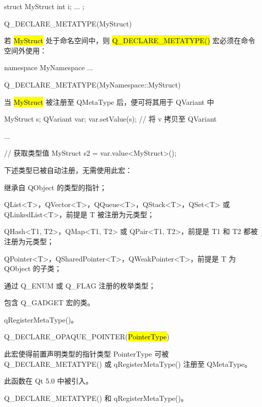 \begin{cppcode}
struct MyStruct
{
    int i;
    ...
};

Q_DECLARE_METATYPE(MyStruct)
\end{cppcode}

若 \hl{MyStruct} 处于命名空间中，则 \hl{Q\_DECLARE\_METATYPE()} 宏必须在命令空间外使用：

\begin{cppcode}
namespace MyNamespace
{
    ...
}

Q_DECLARE_METATYPE(MyNamespace::MyStruct)
\end{cppcode}

当 \hl{MyStruct} 被注册至 QMetaType 后，便可将其用于 QVariant 中

\begin{cppcode}
MyStruct s;
QVariant var;
var.setValue(s); // 将 v 拷贝至 QVariant

...

// 获取类型值
MyStruct s2 = var.value<MyStruct>();
\end{cppcode}

下述类型已被自动注册，无需使用此宏：

\begin{compactitem}
\item 继承自 QObject 的类型的指针；
\item QList<T>，QVector<T>，QQueue<T>，QStack<T>，QSet<T> 或 QLinkedList<T>，前提是 T 被注册为元类型；
\item QHash<T1, T2>，QMap<T1, T2> 或 QPair<T1, T2>，前提是 T1 和 T2 都被注册为元类型；
\item QPointer<T>，QSharedPointer<T>，QWeakPointer<T>，前提是 T 为 QObject 的子类；
\item 通过 Q\_ENUM 或 Q\_FLAG 注册的枚举类型；
\item 包含 Q\_GADGET 宏的类。
\end{compactitem}

\begin{seeAlso}
qRegisterMetaType()。
\end{seeAlso}


Q\_DECLARE\_OPAQUE\_POINTER(\hl{PointerType})

此宏使得前置声明类型的指针类型 PointerType 可被 Q\_DECLARE\_METATYPE() 或 qRegisterMetaType() 注册至 QMetaType。

此函数在 Qt 5.0 中被引入。

\begin{seeAlso}
Q\_DECLARE\_METATYPE() 和 qRegisterMetaType()。
\end{seeAlso}

